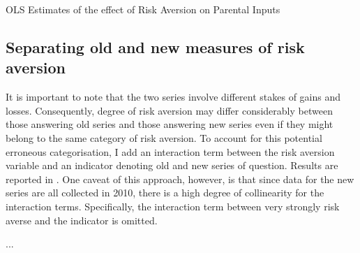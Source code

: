 \documentclass[]{article}
\begin{document}
\begin{table}
	\centering \setlength{\extrarowheight}{0.1em}
	\caption{OLS Estimates of the effect of Risk Aversion on Parental Inputs}
	
	\label{table:4}
\end{table}

\pagebreak 

\subsection{Separating old and new measures of risk aversion}
It is important to note that the two series involve different stakes of gains and losses. Consequently, degree of risk aversion may differ considerably between those answering old series and those answering new series even if they might belong to the same category of risk aversion. To account for this potential erroneous categorisation, I add an interaction term between the risk aversion variable and an indicator denoting old and new series of question. Results are reported in . One caveat of this approach, however, is that since data for the new series are all collected in 2010, there is a high degree of collinearity for the interaction terms. Specifically, the interaction term between very strongly risk averse and the indicator is omitted. 

\pagebreak
    
\begin{ThreePartTable}
	\centering
	\setlength{\extrarowheight}{0.1em}
	\begin{TableNotes}\footnotesize
		\item ... 
	\end{TableNotes}
	
\end{ThreePartTable}


\pagebreak

%
%
\end{document}
